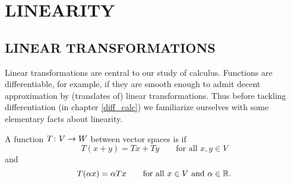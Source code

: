 \chapter{LINEARITY}


\section{LINEAR TRANSFORMATIONS}  Linear transformations are central to our study of calculus.
Functions are differentiable, for example, if they are smooth enough to admit decent
approximation by (translates of) linear transformations. Thus before tackling differentiation
(in chapter \ref{diff_calc}) we familiarize ourselves with some elementary facts about
linearity.

\begin{defn}  A function $T \colon V \rightarrow W$ between vector spaces is
 if
 \begin{equation}\label{lt_cond1}
      T(x + y) = Tx + Ty \qquad \text{for all $x,y \in V$}
 \end{equation}
and
 \begin{equation}\label{lt_cond2}
     T(\alpha x) = \alpha Tx \qquad \text{for all $x \in V$ and
           $\alpha \in \mathbb{R}$.}
 \end{equation}
\end{defn}

